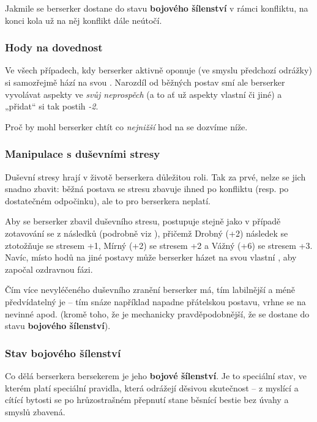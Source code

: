 \documentclass[../main.tex]{subfiles}
\begin{document}
Jakmile se berserker dostane do stavu \textbf{bojového šílenství} v rámci konfliktu, na konci kola už na něj konflikt dále neútočí.
\subsubsection*{Hody na dovednost }
Ve všech případech, kdy berserker aktivně oponuje    (ve smyslu předchozí odrážky) si samozřejmě hází na  svou . Narozdíl od běžných postav smí ale berserker vyvolávat aspekty ve \textit{svůj neprospěch} (a to ať už aspekty vlastní či jiné) a „přidat“ si tak postih \textit{-2}. 

Proč by mohl berserker chtít co \textit{nejnižší} hod na  se dozvíme níže.

\subsubsection*{Manipulace s duševními stresy}
Duševní stresy hrají v životě berserkera důležitou roli. Tak za prvé, nelze se jich snadno zbavit: běžná postava se stresu zbavuje ihned po konfliktu (resp. po dostatečném odpočinku), ale to pro berserkera neplatí.

Aby se berserker zbavil duševního stresu, postupuje stejně jako v případě zotavování se z následků (podrobně viz ), přičemž Drobný (+2) následek se ztotožňuje se stresem +1, Mírný (+2) se stresem +2 a Vážný (+6) se stresem +3. Navíc, místo hodů na  jiné postavy může berserker házet na svou vlastní , aby započal ozdravnou fázi.

Čím více nevyléčeného duševního zranění berserker má, tím labilnější a méně předvídatelný je – tím snáze například napadne přátelskou postavu, vrhne se na nevinné apod. (kromě toho, že je mechanicky pravděpodobnější, že se dostane do stavu \textbf{bojového šílenství}).

\subsubsection*{Stav bojového šílenství}
Co dělá berserkera bersekerem je jeho \textbf{bojové šílenství}. Je to speciální stav, ve kterém platí speciální pravidla, která odrážejí děsivou skutečnost – z myslící a cítící bytosti se po hrůzostrašném přepnutí stane běsnící bestie bez úvahy a smyslů zbavená.
\end{document}
